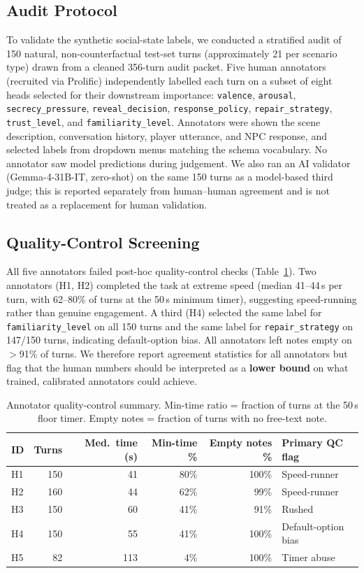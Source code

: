 \documentclass[11pt]{article}
\begin{document}
\subsection{Audit Protocol}

To validate the synthetic social-state labels, we conducted a stratified audit of 150 natural, non-counterfactual test-set turns (approximately 21 per scenario type) drawn from a cleaned 356-turn audit packet.
Five human annotators (recruited via Prolific) independently labelled each turn on a subset of eight heads selected for their downstream importance:
\texttt{valence}, \texttt{arousal}, \texttt{secrecy\_pressure}, \texttt{reveal\_decision}, \texttt{response\_policy}, \texttt{repair\_strategy}, \texttt{trust\_level}, and \texttt{familiarity\_level}.
Annotators were shown the scene description, conversation history, player utterance, and NPC response, and selected labels from dropdown menus matching the schema vocabulary.
No annotator saw model predictions during judgement.
We also ran an AI validator (Gemma-4-31B-IT, zero-shot) on the same 150 turns as a model-based third judge; this is reported separately from human--human agreement and is not treated as a replacement for human validation.

\subsection{Quality-Control Screening}

All five annotators failed post-hoc quality-control checks (Table~\ref{tab:audit_qc}).
Two annotators (H1, H2) completed the task at extreme speed (median 41--44\,s per turn, with 62--80\% of turns at the 50\,s minimum timer), suggesting speed-running rather than genuine engagement.
A third (H4) selected the same label for \texttt{familiarity\_level} on all 150 turns and the same label for \texttt{repair\_strategy} on 147/150 turns, indicating default-option bias.
All annotators left notes empty on $>$91\% of turns.
We therefore report agreement statistics for all annotators but flag that the human numbers should be interpreted as a \textbf{lower bound} on what trained, calibrated annotators could achieve.

\begin{table}[h]
\centering
\caption{Annotator quality-control summary. Min-time ratio = fraction of turns at the 50\,s floor timer. Empty notes = fraction of turns with no free-text note.}
\label{tab:audit_qc}
\small
\begin{tabular}{@{}lrrrrp{4.2cm}@{}}
\toprule
\textbf{ID} & \textbf{Turns} & \textbf{Med.\ time (s)} & \textbf{Min-time \%} & \textbf{Empty notes \%} & \textbf{Primary QC flag} \\
\midrule
H1 & 150 & 41 & 80\% & 100\% & Speed-runner \\
H2 & 160 & 44 & 62\% & 99\% & Speed-runner \\
H3 & 150 & 60 & 41\% & 91\% & Rushed \\
H4 & 150 & 55 & 41\% & 100\% & Default-option bias \\
H5 & 82 & 113 & 4\% & 100\% & Timer abuse \\
\bottomrule
\end{tabular}
\end{table}
\end{document}
